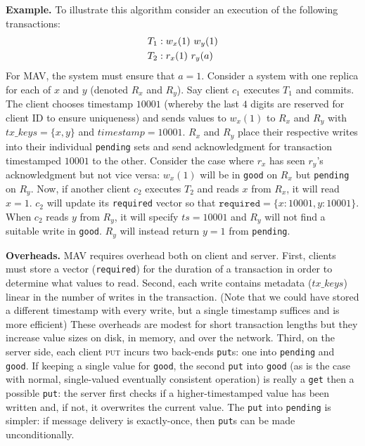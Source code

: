 \vspace{1em}\noindent\textbf{Example.} To illustrate this algorithm consider an execution of the following transactions:
\begin{align*}
\small\vspace{-1em}
T_1 &: w_x(1)~w_y(1)
\\T_2 &: r_x(1)~r_y(a)
\end{align*}
For MAV, the system must ensure that $a=1$. Consider a system with one
replica for each of $x$ and $y$ (denoted $R_x$ and $R_y$). Say client
$c_1$ executes $T_1$ and commits. The client chooses timestamp $10001$
(whereby the last $4$ digits are reserved for client ID to ensure
uniqueness) and sends values to $w_x(1)$ to $R_x$ and $R_y$ with
$tx\_keys = \{x,y\}$ and $timestamp=10001$. $R_x$ and $R_y$ place
their respective writes into their individual \texttt{pending} sets
and send acknowledgment for transaction timestamped $10001$ to the
other. Consider the case where $r_x$ has seen $r_y$'s acknowledgment
but not vice versa: $w_x(1)$ will be in \texttt{good} on $R_x$
but \texttt{pending} on $R_y$. Now, if another client $c_2$ executes
$T_2$ and reads $x$ from $R_x$, it will read $x=1$. $c_2$ will update
its \texttt{required} vector so that $\texttt{required}=\{x:10001,
y:10001\}$. When $c_2$ reads $y$ from $R_y$, it will specify
$ts=10001$ and $R_y$ will not find a suitable write
in \texttt{good}. $R_y$ will instead return $y=1$
from \texttt{pending}.

\vspace{1em}\noindent\textbf{Overheads.} MAV requires overhead both on client and server. First, clients must store a vector (\texttt{required}) for the duration of a transaction in order to determine what values to read. Second, each write contains metadata ($tx\_keys$) linear in the number of writes in the transaction. (Note that we could have stored a different timestamp with every write, but a single timestamp suffices and is more efficient) These overheads are modest for short transaction lengths but they increase value sizes on disk, in memory, and over the network. Third, on the server side, each client \textsc{put} incurs two back-ends \texttt{put}s: one into \texttt{pending} and \texttt{good}. If keeping a single value for \texttt{good}, the second \texttt{put} into \texttt{good} (as is the case with normal, single-valued eventually consistent operation) is really a \texttt{get} then a possible \texttt{put}: the server first checks if a higher-timestamped value has been written and, if not, it overwrites the current value. The \texttt{put} into \texttt{pending} is simpler: if message delivery is exactly-once, then \texttt{put}s can be made unconditionally.


